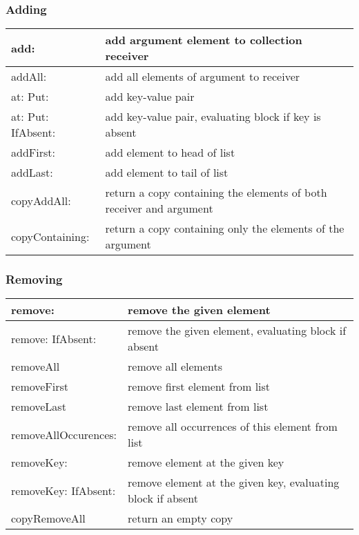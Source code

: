 \documentclass[letterpaper,10pt,english]{sphinxmanual}
\begin{document}
\subsubsection{Adding}
\label{\detokenize{usefulselectors:adding}}
\noindent\begin{tabulary}{\linewidth}{p{5cm} p{10cm}}
\hline

add:
&
add argument element to collection receiver
\\
\hline
addAll:
&
add all elements of argument to receiver
\\
\hline
at: Put:
&
add key-value pair
\\
\hline
at: Put: IfAbsent:
&
add key-value pair, evaluating block if key is absent
\\
\hline
addFirst:
&
add element to head of list
\\
\hline
addLast:
&
add element to tail of list
\\
\hline
copyAddAll:
&
return a copy containing the elements of both receiver and argument
\\
\hline
copyContaining:
&
return a copy containing only the elements of the argument
\\
\hline\end{tabulary}



\subsubsection{Removing}
\label{\detokenize{usefulselectors:removing}}
\noindent\begin{tabulary}{\linewidth}{p{5cm} p{10cm}}
\hline

remove:
&
remove the given element
\\
\hline
remove: IfAbsent:
&
remove the given element, evaluating block if absent
\\
\hline
removeAll
&
remove all elements
\\
\hline
removeFirst
&
remove first element from list
\\
\hline
removeLast
&
remove last element from list
\\
\hline
removeAllOccurences:
&
remove all occurrences of this element from list
\\
\hline
removeKey:
&
remove element at the given key
\\
\hline
removeKey: IfAbsent:
&
remove element at the given key, evaluating block if absent
\\
\hline
copyRemoveAll
&
return an empty copy
\\
\hline\end{tabulary}
\end{document}
